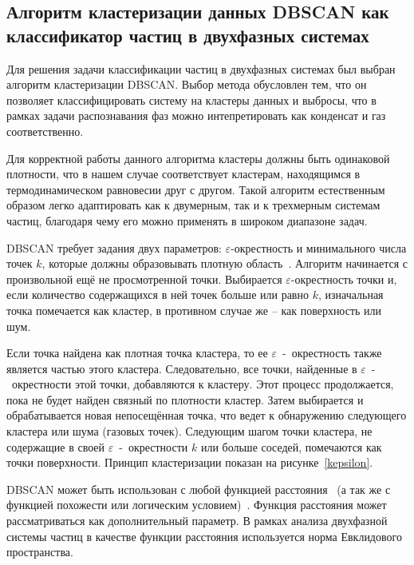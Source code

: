 \subsection{Алгоритм кластеризации данных DBSCAN как классификатор частиц в двухфазных системах}
\label{PRIMe-SubSecDBSCAN}

Для решения задачи классификации частиц в двухфазных системах был выбран алгоритм кластеризации DBSCAN.
Выбор метода обусловлен тем, что он позволяет классифицировать систему на кластеры данных и выбросы, что в рамках задачи распознавания фаз можно интепретировать как конденсат и газ соответственно.

Для корректной работы данного алгоритма кластеры должны быть одинаковой плотности, что в нашем случае соответствует кластерам, находящимся в термодинамическом равновесии друг с другом.
Такой алгоритм естественным образом легко адаптировать как к двумерным, так и к трехмерным системам частиц, благодаря чему его можно применять в широком диапазоне задач.

DBSCAN требует задания двух параметров: $\varepsilon$-окрестность и минимального числа точек $k$, которые должны образовывать плотную область~\cite{schubert2017dbscan}.
Алгоритм начинается с произвольной ещё не просмотренной точки.
Выбирается $\varepsilon$-окрестность точки и, если количество содержащихся в ней точек больше или равно $k$, изначальная точка помечается как кластер, в противном случае же -- как поверхность или шум.

Если точка найдена как плотная точка кластера, то ее $\varepsilon$~-~окрестность также является частью этого кластера.
Следовательно, все точки, найденные в $\varepsilon$~-~окрестности этой точки, добавляются к кластеру.
Этот процесс продолжается, пока не будет найден связный по плотности кластер.
Затем выбирается и обрабатывается новая непосещённая точка, что ведет к обнаружению следующего кластера или шума (газовых точек).
Следующим шагом точки кластера, не содержащие в своей $\varepsilon$~-~окрестности $k$ или больше соседей, помечаются как точки поверхности.
Принцип кластеризации показан на рисунке~\ref{kepsilon}.

DBSCAN может быть использован с любой функцией расстояния~\cite{schubert2017dbscan} (а так же с функцией похожести или логическим условием)~\cite{10.1023/a:1009745219419}.
Функция расстояния может рассматриваться как дополнительный параметр.
В рамках анализа двухфазной системы частиц в качестве функции расстояния используется норма Евклидового пространства.

